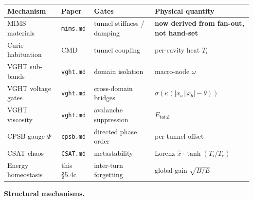 \documentclass[
  11pt,
  a4paper,
]{article}
\begin{document}
\begin{longtable}[]{@{}
  >{\raggedright\arraybackslash}p{}
  >{\raggedright\arraybackslash}p{}
  >{\raggedright\arraybackslash}p{}
  >{\raggedright\arraybackslash}p{}@{}}
\toprule\noalign{}
\begin{minipage}[b]{\linewidth}\raggedright
Mechanism
\end{minipage} & \begin{minipage}[b]{\linewidth}\raggedright
Paper
\end{minipage} & \begin{minipage}[b]{\linewidth}\raggedright
Gates
\end{minipage} & \begin{minipage}[b]{\linewidth}\raggedright
Physical quantity
\end{minipage} \\
\midrule\noalign{}
\endhead
\bottomrule\noalign{}
\endlastfoot
MIMS materials & \texttt{mims.md} & tunnel stiffness / damping &
\textbf{now derived from fan-out, not hand-set} \\
Curie habituation & CMD & tunnel coupling & per-cavity heat \(T_i\) \\
VGHT sub-bands & \texttt{vght.md} & domain isolation & macro-node
\(\omega\) \\
VGHT voltage gates & \texttt{vght.md} & cross-domain bridges &
\(\sigma(\kappa(|x_a||x_b| - \theta))\) \\
VGHT viscosity & \texttt{vght.md} & avalanche suppression &
\(E_{\text{total}}\) \\
CPSB gauge \(\Psi\) & \texttt{cpsb.md} & directed phase order &
per-tunnel offset \\
CSAT chaos & \texttt{CSAT.md} & metastability & Lorenz
\(\hat x \cdot \tanh(T_i/T_c)\) \\
Energy homeostasis & this §5.4c & inter-turn forgetting & global gain
\(\sqrt{B/E}\) \\
\end{longtable}

\textbf{Structural mechanisms.}
\end{document}
